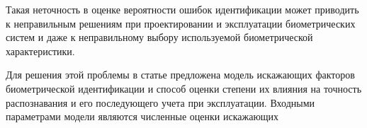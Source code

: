 \begin{multicols}{2}
  Такая неточность в оценке вероятности ошибок идентификации может приводить к 
не\-пра\-вильным решениям при проектировании и эксплуатации биометрических систем и даже к 
неправильному выбору используемой биометрической характеристики.
  
  Для решения этой проблемы в статье предложена модель искажающих факторов 
биометрической идентификации и способ оценки степени их влияния на точность распознавания 
и его последующего учета при эксплуатации. Входными параметрами модели являются 
численные оценки искажающих\linebreak\vspace*{-12pt}
\pagebreak

\end{multicols}

\begin{figure} %
\vspace*{1pt}
\begin{center}
\mbox{%
\epsfxsize=154.762mm
}
\end{center}
\vspace*{-9pt}
\end{figure}

